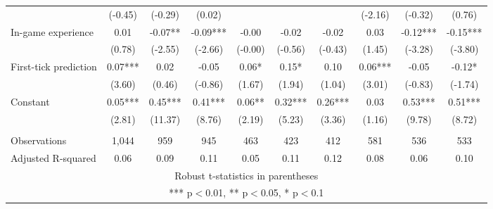 \documentclass[]{article}
\begin{document}
\begin{tabular}{lccccccccc}
 & (-0.45) & (-0.29) & (0.02) &  &  &  & (-2.16) & (-0.32) & (0.76) \\
In-game experience & 0.01 & -0.07** & -0.09*** & -0.00 & -0.02 & -0.02 & 0.03 & -0.12*** & -0.15*** \\
 & (0.78) & (-2.55) & (-2.66) & (-0.00) & (-0.56) & (-0.43) & (1.45) & (-3.28) & (-3.80) \\
First-tick prediction & 0.07*** & 0.02 & -0.05 & 0.06* & 0.15* & 0.10 & 0.06*** & -0.05 & -0.12* \\
 & (3.60) & (0.46) & (-0.86) & (1.67) & (1.94) & (1.04) & (3.01) & (-0.83) & (-1.74) \\
Constant & 0.05*** & 0.45*** & 0.41*** & 0.06** & 0.32*** & 0.26*** & 0.03 & 0.53*** & 0.51*** \\
 & (2.81) & (11.37) & (8.76) & (2.19) & (5.23) & (3.36) & (1.16) & (9.78) & (8.72) \\
 &  &  &  &  &  &  &  &  &  \\
Observations & 1,044 & 959 & 945 & 463 & 423 & 412 & 581 & 536 & 533 \\
 Adjusted R-squared & 0.06 & 0.09 & 0.11 & 0.05 & 0.11 & 0.12 & 0.08 & 0.06 & 0.10 \\ \hline
\multicolumn{10}{c}{ Robust t-statistics in parentheses} \\
\multicolumn{10}{c}{ *** p$<$0.01, ** p$<$0.05, * p$<$0.1} \\
\end{tabular}
\end{document}
